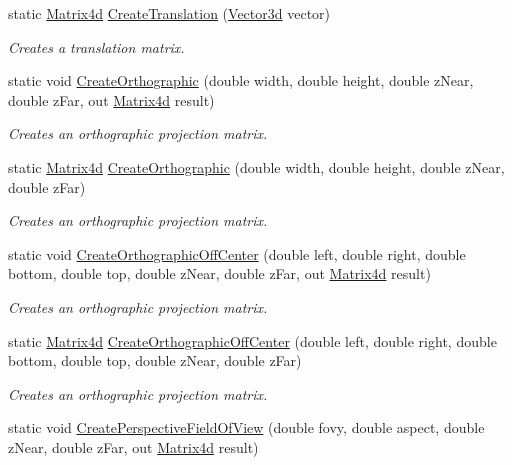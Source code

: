 \begin{DoxyCompactItemize}
static \hyperlink{struct_open_t_k_1_1_matrix4d}{Matrix4d} \hyperlink{struct_open_t_k_1_1_matrix4d_af64bb00abee425d7bb2c41594078af9f}{Create\-Translation} (\hyperlink{struct_open_t_k_1_1_vector3d}{Vector3d} vector)
\begin{DoxyCompactList}\small\item\em Creates a translation matrix. \end{DoxyCompactList}\item 
static void \hyperlink{struct_open_t_k_1_1_matrix4d_ac66f206316d8fe5fb1f014c4dfeaac7a}{Create\-Orthographic} (double width, double height, double z\-Near, double z\-Far, out \hyperlink{struct_open_t_k_1_1_matrix4d}{Matrix4d} result)
\begin{DoxyCompactList}\small\item\em Creates an orthographic projection matrix. \end{DoxyCompactList}\item 
static \hyperlink{struct_open_t_k_1_1_matrix4d}{Matrix4d} \hyperlink{struct_open_t_k_1_1_matrix4d_a7a912e918589733763b02afc80fc553c}{Create\-Orthographic} (double width, double height, double z\-Near, double z\-Far)
\begin{DoxyCompactList}\small\item\em Creates an orthographic projection matrix. \end{DoxyCompactList}\item 
static void \hyperlink{struct_open_t_k_1_1_matrix4d_ad64334dd9745b88790bc53888bff5b85}{Create\-Orthographic\-Off\-Center} (double left, double right, double bottom, double top, double z\-Near, double z\-Far, out \hyperlink{struct_open_t_k_1_1_matrix4d}{Matrix4d} result)
\begin{DoxyCompactList}\small\item\em Creates an orthographic projection matrix. \end{DoxyCompactList}\item 
static \hyperlink{struct_open_t_k_1_1_matrix4d}{Matrix4d} \hyperlink{struct_open_t_k_1_1_matrix4d_a84706e76cdbd4ab154b48ae5e115d977}{Create\-Orthographic\-Off\-Center} (double left, double right, double bottom, double top, double z\-Near, double z\-Far)
\begin{DoxyCompactList}\small\item\em Creates an orthographic projection matrix. \end{DoxyCompactList}\item 
static void \hyperlink{struct_open_t_k_1_1_matrix4d_a81234bd81f7c179f4a80004045b593ea}{Create\-Perspective\-Field\-Of\-View} (double fovy, double aspect, double z\-Near, double z\-Far, out \hyperlink{struct_open_t_k_1_1_matrix4d}{Matrix4d} result)

\end{DoxyCompactItemize}
